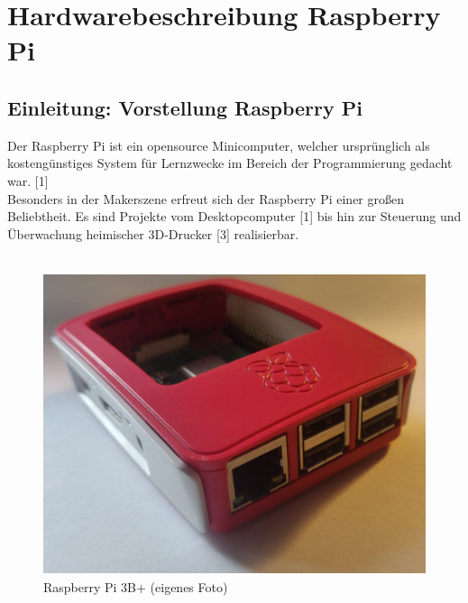 \documentclass[12pt,a4paper,openany]{scrbook}
\begin{document}
	
	 
	\newpage
\chapter*{Hardwarebeschreibung Raspberry Pi}

\section{Einleitung: Vorstellung Raspberry Pi}
Der Raspberry Pi ist ein opensource Minicomputer, welcher ursprünglich als kostengünstiges System für Lernzwecke im Bereich der Programmierung gedacht war. [1]  \\
Besonders in der Makerszene erfreut sich der Raspberry Pi einer großen Beliebtheit. Es sind Projekte vom Desktopcomputer [1] bis hin zur Steuerung und Überwachung heimischer 3D-Drucker [3] realisierbar.\\ 
\\[3mm]


	\begin{figure}[!h]
	\centering
	\includegraphics[height=250pt]{img/pi_mitgehaeuse.png}
	\caption{Raspberry Pi 3B+ (eigenes Foto)}
	\label{Bildlabel}
\end{figure}	
\end{document}
